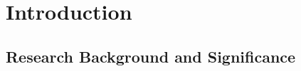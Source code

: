 
\chapter{Introduction}  %

\ifpdf
	\graphicspath{{Chapter1/Figs/Raster/}{Chapter1/Figs/PDF/}{Chapter1/Figs/}}
\else
	\graphicspath{{Chapter1/Figs/Vector/}{Chapter1/Figs/}}
\fi


\section{Research Background and Significance} %
%


